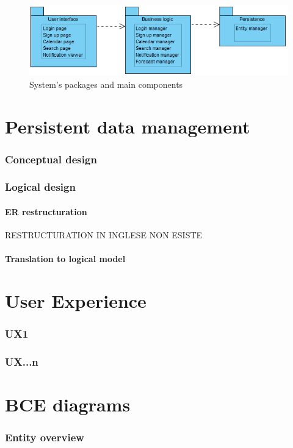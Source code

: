 \documentclass[10pt,a4paper,titlepage]{article}
\begin{document}
\begin{figure}[h]
\centering
\includegraphics[width=\linewidth]{./images/sub-systems}
\caption[Subsystems]{System's packages and main components}
\label{fig:subsystems}
\end{figure}

\clearpage
\part{Persistent data management}
\section{Conceptual design}
\section{Logical design}
\subsection{ER restructuration}
RESTRUCTURATION IN INGLESE NON ESISTE
\subsection{Translation to logical model}

\clearpage
\part{User Experience}
\section{UX1}
\section{UX...n}

\clearpage
\part{BCE diagrams}
\section{Entity overview}
\end{document}
